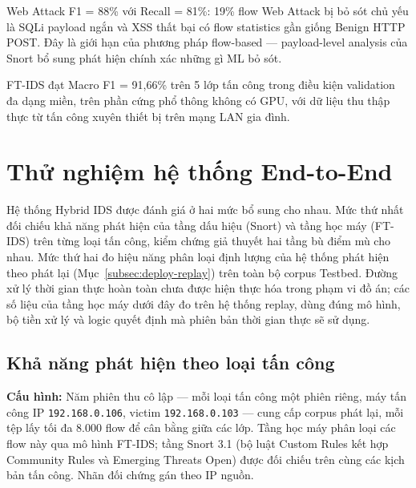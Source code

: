 \documentclass[../DoAn.tex]{subfiles}
\begin{document}
Web Attack F1 = 88\% với Recall = 81\%: 19\% flow Web Attack bị bỏ sót chủ yếu là SQLi payload ngắn và XSS thất bại có flow statistics gần giống Benign HTTP POST. Đây là giới hạn của phương pháp flow-based --- payload-level analysis của Snort bổ sung phát hiện chính xác những gì ML bỏ sót.

FT-IDS đạt Macro F1 = 91,66\% trên 5 lớp tấn công trong điều kiện validation đa dạng miền, trên phần cứng phổ thông không có GPU, với dữ liệu thu thập thực từ tấn công xuyên thiết bị trên mạng LAN gia đình.

\section{Thử nghiệm hệ thống End-to-End}
\label{sec:tn-e2e}

Hệ thống Hybrid IDS được đánh giá ở hai mức bổ sung cho nhau. Mức thứ nhất đối chiếu khả năng phát hiện của tầng dấu hiệu (Snort) và tầng học máy (FT-IDS) trên từng loại tấn công, kiểm chứng giả thuyết hai tầng bù điểm mù cho nhau. Mức thứ hai đo hiệu năng phân loại định lượng của hệ thống phát hiện theo phát lại (Mục~\ref{subsec:deploy-replay}) trên toàn bộ corpus Testbed. Đường xử lý thời gian thực hoàn toàn chưa được hiện thực hóa trong phạm vi đồ án; các số liệu của tầng học máy dưới đây đo trên hệ thống replay, dùng đúng mô hình, bộ tiền xử lý và logic quyết định mà phiên bản thời gian thực sẽ sử dụng.

\subsection{Khả năng phát hiện theo loại tấn công}
\label{subsec:e2e-complementarity}

\textbf{Cấu hình:} Năm phiên thu cô lập --- mỗi loại tấn công một phiên riêng, máy tấn công IP \texttt{192.168.0.106}, victim \texttt{192.168.0.103} --- cung cấp corpus phát lại, mỗi tệp lấy tối đa 8.000 flow để cân bằng giữa các lớp. Tầng học máy phân loại các flow này qua mô hình FT-IDS; tầng Snort 3.1 (bộ luật Custom Rules kết hợp Community Rules và Emerging Threats Open) được đối chiếu trên cùng các kịch bản tấn công. Nhãn đối chứng gán theo IP nguồn.
\end{document}
